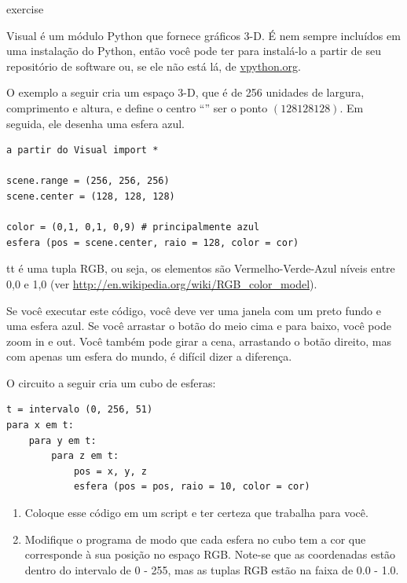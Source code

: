 \documentclass[10pt]{book}
\begin{document}
\begin{exercise}
\begin{v erbatim}
\begin{} exercise

Visual é um módulo Python que fornece gráficos 3-D. É
nem sempre incluídos em uma instalação do Python, então você pode ter
para instalá-lo a partir de seu repositório de software ou, se ele não está lá,
de \url{vpython.org}.

O exemplo a seguir cria um espaço 3-D, que é de 256 unidades
de largura, comprimento e altura, e define o centro ``'' ser o
ponto $ (128128128) $. Em seguida, ele desenha uma esfera azul.

\begin{verbatim}
a partir do Visual import *

scene.range = (256, 256, 256)
scene.center = (128, 128, 128)

color = (0,1, 0,1, 0,9) # principalmente azul
esfera (pos = scene.center, raio = 128, color = cor)
\end{verbatim}

{\Color tt} é uma tupla RGB, ou seja, os elementos são Vermelho-Verde-Azul
níveis entre 0,0 e 1,0 (ver
\url{http://en.wikipedia.org/wiki/RGB_color_model}).

Se você executar este código, você deve ver uma janela com um preto
fundo e uma esfera azul. Se você arrastar o botão do meio
cima e para baixo, você pode zoom in e out. Você também pode girar
a cena, arrastando o botão direito, mas com apenas um
esfera do mundo, é difícil dizer a diferença.

O circuito a seguir cria um cubo de esferas:

\begin{verbatim}
t = intervalo (0, 256, 51)
para x em t:
    para y em t:
        para z em t:
            pos = x, y, z
            esfera (pos = pos, raio = 10, color = cor)
\end{verbatim}

\begin{enumerate}

\item Coloque esse código em um script e ter certeza que trabalha para
você.

\item Modifique o programa de modo que cada esfera no cubo
tem a cor que corresponde à sua posição no espaço RGB.
Note-se que as coordenadas estão dentro do intervalo de 0 - 255, mas
as tuplas RGB estão na faixa de 0.0 - 1.0.


\end{enumerate}
\end{}
\end{v erbatim}
\end{exercise}
\end{document}
